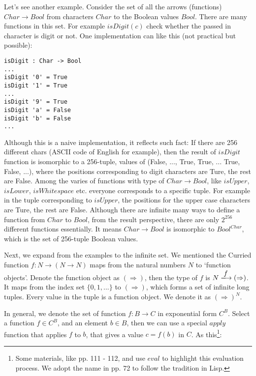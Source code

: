 \documentclass{article}
\begin{document}
\begin{example}
\normalfont
Let's see another example. Consider the set of all the arrows (functions) $Char \to Bool$ from characters $Char$ to the Boolean values $Bool$. There are many functions in this set. For example $isDigit(c)$ check whether the passed in character is digit or not. One implementation can like this (not practical but possible):

\lstset{frame=none}
\begin{lstlisting}[style=Haskell]
isDigit : Char -> Bool
...
isDigit '0' = True
isDigit '1' = True
...
isDigit '9' = True
isDigit 'a' = False
isDigit 'b' = False
...
\end{lstlisting}

Although this is a naive implementation, it reflects such fact: If there are 256 different chars (ASCII code of English for example), then the result of $isDigit$ function is isomorphic to a 256-tuple, values of (False, ..., True, True, ... True, False, ...), where the positions corresponding to digit characters are Ture, the rest are False. Among the varies of functions with type of $Char \to Bool$, like $isUpper$, $isLower$, $isWhitespace$ etc. everyone corresponds to a specific tuple. For example in the tuple corresponding to $isUpper$, the positions for the upper case characters are Ture, the rest are False. Although there are infinite many ways to define a function from $Char$ to $Bool$, from the result perspective, there are only $2^{256}$ different functions essentially. It means $Char \to Bool$ is isomorphic to $Bool^{Char}$, which is the set of 256-tuple Boolean values.
\end{example}

Next, we expand from the examples to the infinite set. We mentioned the Curried function $f: N \to (N \to N)$ maps from the natural numbers $N$ to `function objects'. Denote the function object as $(\Rightarrow)$, then the type of $f$ is $N \arrowto{f} (\Rightarrow)$. It maps from the index set $\{0, 1, ...\}$ to $(\Rightarrow)$, which forms a set of infinite long tuples. Every value in the tuple is a function object. We denote it as $(\Rightarrow)^N$.

In general, we denote the set of function $f : B \to C$ in exponential form $C^B$. Select a function $f \in C^B$, and an element $b \in B$, then we can use a special $apply$ function that applies $f$ to $b$, that gives a value $c = f(b)$ in $C$. As this\footnote{Some materials, like \cite{PeterSmith2018} pp. 111 - 112, and \cite{Wiki-Exponentials} use $eval$ to highlight this evaluation process. We adopt the name in \cite{Bird97} pp. 72 to follow the tradition in Lisp.}:
\end{document}
